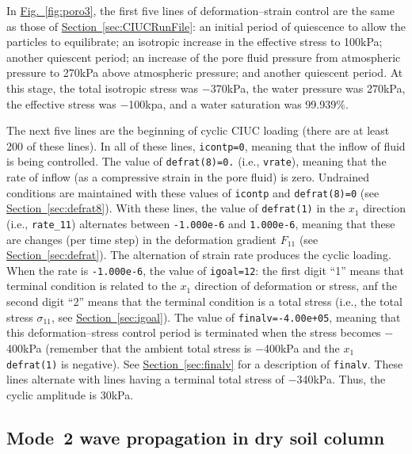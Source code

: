 \documentclass[letterpaper,11pt]{article}
\begin{document}
%
In \hyperref[fig:poro3]{Fig.~\ref*{fig:poro3}},
the first five lines of deformation--strain control
are the same as those of 
\hyperref[sec:CIUCRunFile]{Section~\ref*{sec:CIUCRunFile}}:
an initial period of quiescence to allow the 
particles to equilibrate;
an isotropic increase in the effective stress
to 100kPa;
another quiescent period;
an increase of the pore fluid pressure from
atmospheric pressure to 270kPa
above atmospheric pressure;
and another quiescent period.
At this stage,
the total isotropic stress was $-$370kPa,
the water pressure was 270kPa, the
effective stress was $-$100kpa,
and a water saturation was 99.939\%.
\par
The next five lines are the beginning
of cyclic CIUC loading
(there are at least 200 of these lines).
In all of these lines,
\texttt{icontp=0}, meaning that the inflow of fluid is
being controlled.
The value of \texttt{defrat(8)=0.} (i.e., \texttt{vrate}),
meaning that the rate of inflow (as a compressive strain
in the pore fluid) is zero.
Undrained conditions are maintained with
these values of \texttt{icontp} and \texttt{defrat(8)=0}
(see \hyperref[sec:defrat8]{Section~\ref*{sec:defrat8}}).
With these lines, the value of \texttt{defrat(1)} in the
$x_{1}$ direction (i.e., \texttt{rate\_11}) alternates
between \texttt{-1.000e-6} and \texttt{1.000e-6},
meaning that these are changes (per time step) in
the deformation gradient $F_{11}$
(see \hyperref[sec:defrat]{Section~\ref*{sec:defrat}}).
The alternation of strain rate produces the
cyclic loading.
When the rate is \texttt{-1.000e-6},
the value of \texttt{igoal=12}:
the first digit ``1'' means that terminal condition
is related to the $x_{1}$ direction of deformation
or stress, anf the second digit ``2''
means that the terminal condition is a total stress
(i.e., the total stress $\sigma_{11}$,
see \hyperref[sec:igoal]{Section~\ref*{sec:igoal}}).
The value of \texttt{finalv=-4.00e+05},
meaning that this deformation--stress control
period is terminated when the stress becomes $-$400kPa
(remember that the ambient total stress is
$-$400kPa and the $x_1$ \texttt{defrat(1)} is negative).
See \hyperref[sec:finalv]{Section~\ref*{sec:finalv}}
for a description
of \texttt{finalv}.
These lines alternate with lines having
a terminal total stress of $-$340kPa.
Thus, the cyclic amplitude is 30kPa.
%
%
%
\subsection{Mode~2 wave propagation in dry soil column}\label{sec:mode2example}
%
\end{document}
